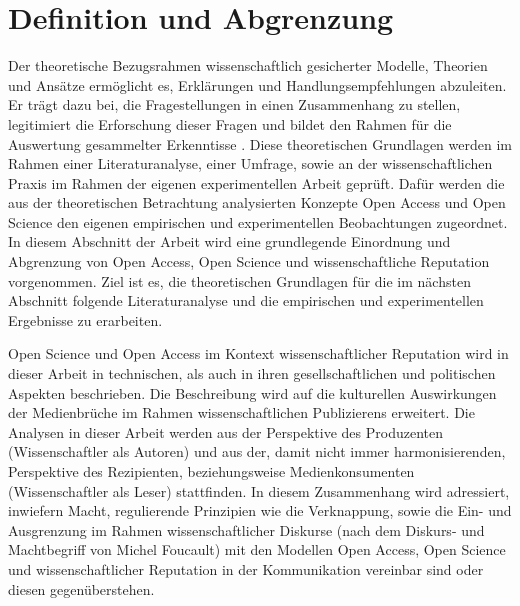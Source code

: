 \chapter{Definition und Abgrenzung} 

Der theoretische Bezugsrahmen wissenschaftlich gesicherter Modelle, Theorien und Ansätze ermöglicht es, Erklärungen und Handlungsempfehlungen abzuleiten\cite{martin_2007_wissenschaftstheorie}. Er trägt dazu bei, die Fragestellungen in einen Zusammenhang zu stellen, legitimiert die Erforschung dieser Fragen und bildet den Rahmen für die Auswertung gesammelter Erkenntisse \cite{suchen}. 
Diese theoretischen Grundlagen werden im Rahmen einer Literaturanalyse, einer Umfrage, sowie an der wissenschaftlichen Praxis im Rahmen der eigenen experimentellen Arbeit geprüft. Dafür werden die aus der theoretischen Betrachtung analysierten Konzepte Open Access und Open Science den eigenen empirischen und experimentellen Beobachtungen zugeordnet. In diesem Abschnitt der Arbeit wird eine grundlegende Einordnung und Abgrenzung von Open Access, Open Science und wissenschaftliche Reputation vorgenommen. Ziel ist es, die theoretischen Grundlagen für die im nächsten Abschnitt folgende Literaturanalyse und die empirischen und experimentellen Ergebnisse zu erarbeiten. 

Open Science und Open Access im Kontext wissenschaftlicher Reputation wird in dieser Arbeit in technischen, als auch in ihren gesellschaftlichen und politischen Aspekten beschrieben. Die Beschreibung wird auf die kulturellen Auswirkungen der Medienbrüche im Rahmen wissenschaftlichen Publizierens erweitert. Die Analysen in dieser Arbeit werden aus der Perspektive des Produzenten (Wissenschaftler als Autoren) und aus der, damit nicht immer harmonisierenden, Perspektive des Rezipienten, beziehungsweise Medienkonsumenten (Wissenschaftler als Leser) stattfinden. In diesem Zusammenhang wird adressiert, inwiefern Macht, regulierende Prinzipien wie die Verknappung, sowie die Ein- und Ausgrenzung im Rahmen wissenschaftlicher Diskurse (nach dem Diskurs- und Machtbegriff von Michel Foucault) mit den Modellen Open Access, Open Science und wissenschaftlicher Reputation in der Kommunikation vereinbar sind oder diesen gegenüberstehen. 

